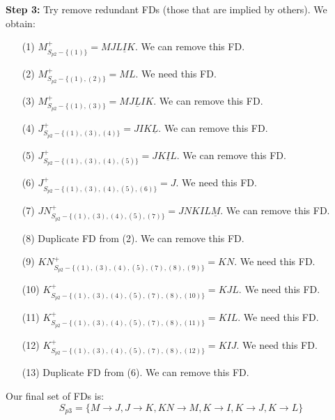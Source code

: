\documentclass[12pt]{article}
\begin{document}
\begin{enumerate}
\begin{itemize}
    \textbf{Step 3:} Try remove redundant FDs (those that are implied by others). We obtain:
    \begin{itemize}
      \item[(1)] $M^+_{S_{p2} - \{(1)\}} = MJL\underline IK$. We can remove this FD.
      \item[(2)] $M^+_{S_{p2} - \{(1), (2)\}} = ML$. We need this FD.
      \item[(3)] $M^+_{S_{p2} - \{(1), (3)\}} = MJ\underline LIK$. We can remove this FD.
      \item[(4)] $J^+_{S_{p2} - \{(1), (3), (4)\}} = JIK\underline L$. We can remove this FD.
      \item[(5)] $J^+_{S_{p2} - \{(1), (3), (4), (5)\}} = JK\underline IL$. We can remove this FD.
      \item[(6)] $J^+_{S_{p2} - \{(1), (3), (4), (5), (6)\}} = J$. We need this FD.
      \item[(7)] $JN^+_{S_{p2} - \{(1), (3), (4), (5), (7)\}} = JNKIL\underline M$. We can remove this FD.
      \item[(8)] Duplicate FD from (2). We can remove this FD.
      \item[(9)] $KN^+_{S_{p2} - \{(1), (3), (4), (5), (7), (8), (9)\}} = KN$. We need this FD.
      \item[(10)] $K^+_{S_{p2} - \{(1), (3), (4), (5), (7), (8), (10)\}} = KJL$. We need this FD.
      \item[(11)] $K^+_{S_{p2} - \{(1), (3), (4), (5), (7), (8), (11)\}} = KIL$. We need this FD.
      \item[(12)] $K^+_{S_{p2} - \{(1), (3), (4), (5), (7), (8), (12)\}} = KIJ$. We need this FD.
      \item[(13)] Duplicate FD from (6). We can remove this FD.
    \end{itemize}

    \singlespacing

    \vspace{5pt}

    Our final set of FDs is:
    $$S_{p3} = \{M \rightarrow J, J \rightarrow K, KN \rightarrow M, K \rightarrow I, K \rightarrow J, K \rightarrow L\}$$

    \vspace{10pt}


\end{itemize}
\end{enumerate}
\end{document}
